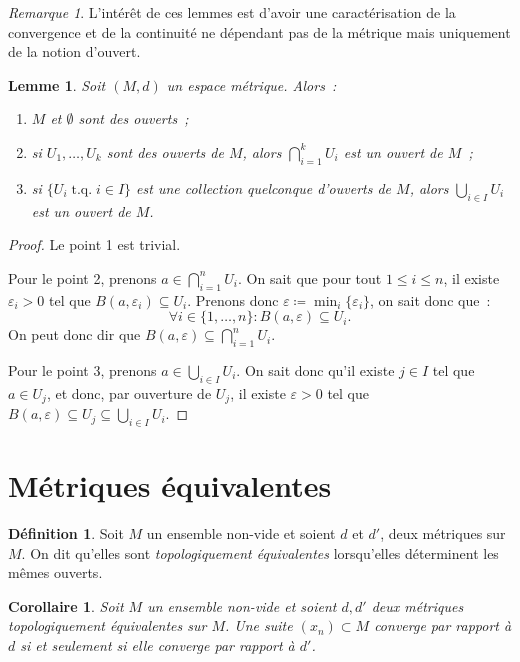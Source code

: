 \documentclass{report}
\newtheorem{lem}[thm]{Lemme}
\newtheorem{cor}[thm]{Corollaire}
\theoremstyle{definition}
\newtheorem{déf}[thm]{Définition}
\theoremstyle{remark}
\newtheorem*{rmq}{Remarque}
\DeclareMathOperator{\tq}{\text{ t.q. }}
\begin{document}
		\begin{rmq} L'intérêt de ces lemmes est d'avoir une caractérisation de la convergence et de la continuité ne dépendant pas de la métrique mais uniquement
		de la notion d'ouvert.
		\end{rmq}
		
		\begin{lem} Soit $(M, d)$ un espace métrique. Alors~:
		\begin{enumerate}
			\item $M$ et $\emptyset$ sont des ouverts~;
			\item si $U_1, \ldots, U_k$ sont des ouverts de $M$, alors $\bigcap_{i=1}^kU_i$ est un ouvert de $M$~;
			\item si $\{U_i \tq i \in I\}$ est une collection quelconque d'ouverts de $M$, alors $\bigcup_{i\in I}U_i$ est un ouvert de $M$.
		\end{enumerate}
		\end{lem}
		
		\begin{proof} Le point 1 est trivial.
		
		Pour le point 2, prenons $a \in \bigcap_{i=1}^nU_i$. On sait que pour tout $1 \leq i \leq n$, il existe $\varepsilon_i > 0$ tel que
		$B(a, \varepsilon_i) \subseteq U_i$. Prenons donc $\varepsilon \coloneqq \min_i\{\varepsilon_i\}$, on sait donc que~:
		\[\forall i \in \{1, \ldots, n\} : B(a, \varepsilon) \subseteq U_i.\]
		On peut donc dir que $B(a, \varepsilon) \subseteq \bigcap_{i=1}^nU_i$.
		
		Pour le point 3, prenons $a \in \bigcup_{i\in I}U_i$. On sait donc qu'il existe $j \in I$ tel que $a \in U_j$, et donc, par ouverture de $U_j$, il existe
		$\varepsilon > 0$ tel que $B(a, \varepsilon) \subseteq U_j \subseteq \bigcup_{i\in I}U_i$.
		\end{proof}
		
	\section{Métriques équivalentes}
		\begin{déf} Soit $M$ un ensemble non-vide et soient $d$ et $d'$, deux métriques sur $M$. On dit qu'elles sont \textit{topologiquement équivalentes} lorsqu'elles
		déterminent les mêmes ouverts.
		\end{déf}
		
		\begin{cor} Soit $M$ un ensemble non-vide et soient $d, d'$ deux métriques topologiquement équivalentes sur $M$. Une suite $(x_n) \subset M$ converge par
		rapport à $d$ si et seulement si elle converge par rapport à $d'$.
		\end{cor}
		
\end{document}
